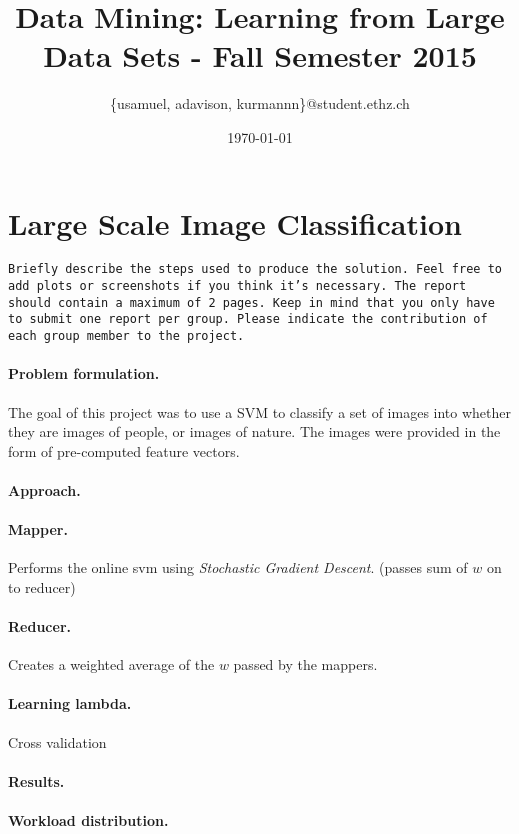 \documentclass[a4paper, 11pt]{article}
\title{Data Mining: Learning from Large Data Sets - Fall Semester 2015}
\author{\{usamuel, adavison, kurmannn\}@student.ethz.ch}
\date{\today}
\begin{document}
\maketitle

\section*{Large Scale Image Classification} 

\texttt{Briefly describe the steps used to produce the solution. Feel free to add plots or screenshots if you think it's necessary. The report should contain a maximum of 2 pages.
Keep in mind that you only have to submit one report per group. Please indicate the contribution of each group member to the project.}

\paragraph{Problem formulation.\!\!\!}
The goal of this project was to use a SVM to classify a set of images into whether they are images of people, or images of nature. The images were provided in the form of pre-computed feature vectors. 

\paragraph{Approach.\!\!\!}


\paragraph{Mapper.\!\!\!}
Performs the online svm using \emph{Stochastic Gradient Descent}. (passes sum of $w$ on to reducer)

\paragraph{Reducer.\!\!\!}
Creates a weighted average of the $w$ passed by the mappers.

\paragraph{Learning lambda.\!\!\!}
Cross validation

\paragraph{Results.\!\!\!}


\paragraph{Workload distribution.\!\!\!}
\end{document}
